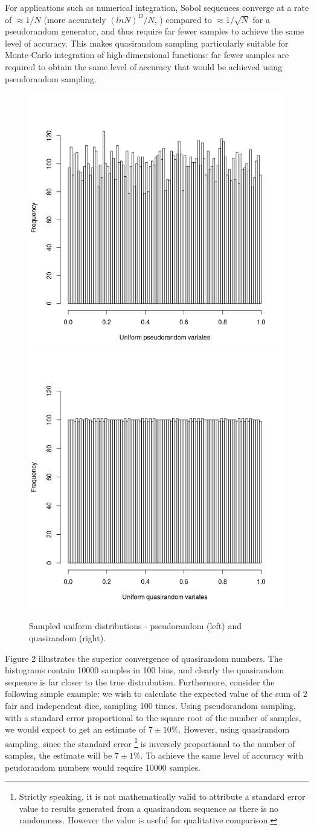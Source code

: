 \documentclass{JASSS}
\begin{document}
For applications such as numerical integration, Sobol sequences converge
at a rate of \(\approx1/N\) (more accurately \((ln N)^D/N\), \cite{press_numerical_nodate})
compared to \(\approx1/\sqrt N\) for a pseudorandom generator, and thus
require far fewer samples to achieve the same level of accuracy. This makes quasirandom sampling particularly suitable for Monte-Carlo integration of high-dimensional functions: far fewer samples are required to obtain the same level of accuracy that would be achieved using pseudorandom sampling. 

\begin{figure}[!t]
\includegraphics[width=0.5\linewidth]{figures/hist_pseudo} 
\includegraphics[width=0.5\linewidth]{figures/hist_quasi} 
\caption{Sampled uniform distributions -  pseudorandom (left) and quasirandom (right).}
\label{fig:hist_pq_1d}
\end{figure}

Figure 2 illustrates the superior convergence of quasirandom numbers. The histograms contain 10000 samples in 100 bins, and clearly the quasirandom sequence is far closer to the true distrubution. Furthermore, consider the following simple example: we wish to calculate the expected value of the sum of 2 fair and independent dice, sampling 100 times. Using pseudorandom sampling, with a standard error proportional to the square root of the number of samples, we would expect to get an estimate of \(7 \pm 10\%\). However, using quasirandom sampling, since the standard error
\footnote{Strictly speaking, it is not mathematically valid to attribute a standard error value to results generated from a quasirandom sequence as there is no randomness. However the value is useful for qualitative comparison.} 
  is inversely proportional to the number of samples, the estimate will be \(7 \pm 1\%\). To achieve the same level of accuracy with peudorandom numbers would require 10000 samples.
\end{document}
